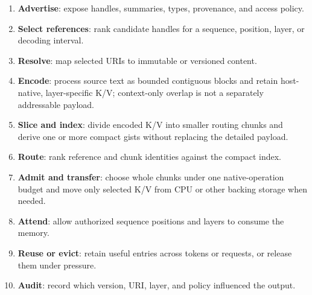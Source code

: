 \documentclass[11pt]{article}
\begin{document}
\begin{enumerate}[leftmargin=*]
\item \textbf{Advertise}: expose handles, summaries, types, provenance, and access policy.
\item \textbf{Select references}: rank candidate handles for a sequence, position, layer, or decoding interval.
\item \textbf{Resolve}: map selected URIs to immutable or versioned content.
\item \textbf{Encode}: process source text as bounded contiguous blocks and retain host-native,
layer-specific K/V; context-only overlap is not a separately addressable payload.
\item \textbf{Slice and index}: divide encoded K/V into smaller routing chunks and derive one or
more compact gists without replacing the detailed payload.
\item \textbf{Route}: rank reference and chunk identities against the compact index.
\item \textbf{Admit and transfer}: choose whole chunks under one native-operation budget and
move only selected K/V from CPU or other backing storage when needed.
\item \textbf{Attend}: allow authorized sequence positions and layers to consume the memory.
\item \textbf{Reuse or evict}: retain useful entries across tokens or requests, or release them under pressure.
\item \textbf{Audit}: record which version, URI, layer, and policy influenced the output.
\end{enumerate}
\end{document}
